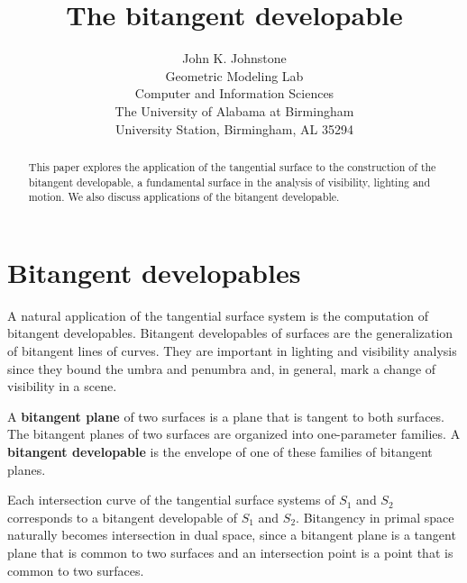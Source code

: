 \documentclass[12pt]{article}
\title{The bitangent developable}
\author{John K. Johnstone\\
	Geometric Modeling Lab\\
	Computer and Information Sciences\\
	The University of Alabama at Birmingham\\
	University Station, Birmingham, AL 35294}
\newif\ifJournal
\begin{document}
\maketitle


\begin{abstract}
This paper explores the application of the tangential surface
to the construction of the bitangent developable,
a fundamental surface in the analysis of visibility, lighting and motion.
We also discuss applications of the bitangent developable.
\end{abstract}

\ifJournal
\noindent {\bf Keywords}: tangential surface,
	  bitangent developable, visibility, lighting, motion planning.
\fi



\section{Bitangent developables}
\label{sec:bitangdev}

A natural application of the tangential surface system
is the computation of bitangent developables.
Bitangent developables of surfaces
are the generalization of bitangent lines of curves.
They are important in lighting and visibility analysis
since they bound the umbra and penumbra and, in general, mark a change
of visibility in a scene.

\begin{defn2}
A {\bf bitangent plane} of two surfaces is a plane that is tangent to
both surfaces.
The bitangent planes of two surfaces are organized into one-parameter families.
A {\bf bitangent developable} is the envelope of one of these
families of bitangent planes.
\end{defn2}

Each intersection curve of the tangential surface systems of $S_1$ and $S_2$
corresponds to a bitangent developable of $S_1$ and $S_2$.
Bitangency in primal space naturally becomes intersection in dual space,
since a bitangent plane is a tangent plane that is common to two surfaces
and an intersection point is a point that is common to two surfaces.
\end{document}
